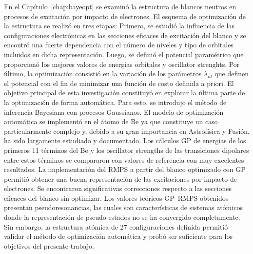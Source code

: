 En el Capítulo~\ref{chap:bayeopt} se examinó la estructura de blancos 
neutros en procesos de excitación por impacto de electrones. El esquema 
de optimización de la estructura se realizó en tres 
etapas: Primero, se estudió la influencia de las configuraciones 
electrónicas en las secciones eficaces de excitación del blanco y se 
encontró una fuerte dependencia con el número de niveles y tipo de 
orbitales incluidos en dicha representación. Luego, se definió el 
potencial paramétrico que proporcionó los mejores valores de energías 
orbitales y oscillator strenghts. Por último, la optimización consistió 
en la variación de los parámetros $\lambda_{nl}$ que definen el potencial 
con el fin de minimizar una función de costo definida a priori. El 
objetivo principal de esta investigación constituyó en explorar la 
última parte de la optimización de forma automática. Para esto, se 
introdujo el método de inferencia Bayesiana con procesos Gaussianos. El
modelo de optimización automática se implementó en el átomo de Be ya que 
constituye un caso particularmente complejo y, debido a su gran 
importancia en Astrofísica y Fusión, ha sido largamente estudiado y 
documentado. Los cálculos GP de energías de los primeros 11 términos del 
Be y los oscillator strengths de las transiciones dipolares entre estos 
términos se compararon con valores de referencia con muy excelentes 
resultados. La implementación del RMPS a partir del blanco optimizado 
con GP permitió obtener una buena representación de las excitaciones por 
impacto de electrones. Se encontraron significativas correcciones 
respecto a las secciones eficaces del blanco sin optimizar. Los valores 
teóricos GP--RMPS obtenidos presentan pseudoresonancias, las cuales son 
características de sistemas atómicos donde la representación de 
pseudo-estados no se ha convergido completamente. Sin embargo, la 
estructura atómica de 27 configuraciones definida permitió validar el 
método de optimización automática y probó ser suficiente para los 
objetivos del presente trabajo. 


